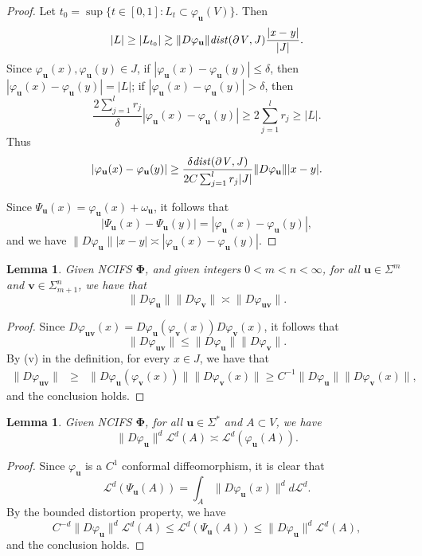 \documentclass[12pt]{amsart}
\theoremstyle{plain}
\newtheorem{lem}[thm]{Lemma}
\theoremstyle{definition}
\theoremstyle{remark}
\newcommand{\bu}{\mathbf{u}}
\newcommand{\bv}{\mathbf{v}}
\begin{document}
\begin{proof}
Let $t_0=\sup\{t\in[0,1] :L_t\subset\varphi_\bu(V)\}$. Then
$$
|L|\ge   |L_{t_0}|\gtrsim \|D\varphi_\bu\|\it{dist}(\partial V, J)\frac{|x-y|}{|J|}.     
$$
Since $\varphi_\bu(x), \varphi_\bu(y)\in J$, if $|\varphi_\bu(x)-\varphi_\bu(y)|\le\delta$, then $|\varphi_\bu(x)-\varphi_\bu(y)|=|L|$; if $|\varphi_\bu(x)-\varphi_\bu(y)|>\delta$, then   
$$
\frac{2\sum_{j=1}^lr_j}{\delta}|\varphi_\bu(x)-\varphi_\bu(y)|\ge2\sum_{j=1}^lr_j\ge|L|.
$$              
Thus
$$
|\varphi_\bu(x)-\varphi_\bu(y)|\ge\frac{\delta \it{dist}(\partial V, J)}{2C\sum_{j=1}^lr_j|J|}\|D\varphi_\mathbf{u}\||x-y|.
$$


Since $\Psi_\bu(x)=\varphi_\bu(x)+\omega_\bu$, it follows that
$$
|\Psi_\mathbf{u}(x)-\Psi_\mathbf{u}(y)|=|\varphi_\mathbf{u}(x)-\varphi_\mathbf{u}(y)|,
$$
and we have $\|D\varphi_\mathbf{u}\||x-y|\asymp|\varphi_\mathbf{u}(x)-\varphi_\mathbf{u}(y)|$.
\end{proof}

\begin{lem}\label{cor_subMul}
Given NCIFS $\boldsymbol{\Phi}$, and given integers $0< m< n<\infty$, for all  $\bu\in\Sigma^m$ and $\bv\in\Sigma_{m+1}^n$,  we have that
\begin{equation}
\|D\varphi_{\bu}\|\|D\varphi_{\bv}\|\asymp \|D\varphi_{\bu\bv}\|.
\end{equation}
\end{lem}	

\begin{proof}
Since $D\varphi_{\mathbf{u}\bv}(x)=D\varphi_{\mathbf{u}}(\varphi_{\bv}(x))D\varphi_{\bv}(x)$, it follows that
$$
\|D\varphi_{\bu\bv}\|\le \|D\varphi_{\bu}\|\|D\varphi_{\bv}\|.
$$
By (v) in the definition, for every $x\in J$, we have that 
\begin{eqnarray*}
\|D\varphi_\mathbf{uv}\|&\ge& \|D\varphi_{\mathbf{u}}(\varphi_{\bv}(x))\|\|D\varphi_{\bv}(x)\|  \ge C^{-1}\|D\varphi_{\mathbf{u}}\|\|D\varphi_{\bv}(x)\|,
\end{eqnarray*}
and the conclusion holds.
\end{proof}

\begin{lem}\label{vol}
Given NCIFS $\boldsymbol{\Phi}$, for all $\mathbf{u}\in\Sigma^*$ and $A\subset V$, we have
\begin{equation}
\|D\varphi_\mathbf{u}\|^d\mathcal{L}^d(A)\asymp\mathcal{L}^d(\varphi_\mathbf{u}(A)).
\end{equation}
\end{lem}	

\begin{proof}
Since $\varphi_\bu$ is a $C^1$ conformal diffeomorphism, it is clear that
$$
\mathcal{L}^d(\Psi_\mathbf{u}(A))=\int_{A}\|D\varphi_\mathbf{u}(x)\|^dd\mathcal{L}^d.
$$
By the bounded distortion property, we have
$$
C^{-d}\|D\varphi_\mathbf{u}\|^d\mathcal{L}^d(A)\le\mathcal{L}^d(\Psi_\mathbf{u}(A))\le \|D\varphi_\mathbf{u}\|^d\mathcal{L}^d(A),
$$
and the conclusion holds.
\end{proof}
\end{document}

